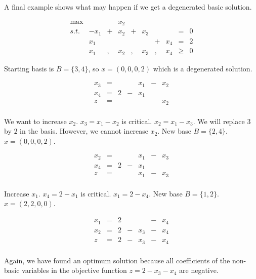 \documentclass[12pt, showidx, twoside]{article}
\begin{document}
{{{A final example shows what may happen if we get a degenerated basic solution.

\begin{equation*}
\begin{array}{rrcrccrcrl}
\max  &     &   &   x_2 &   &     &   &    &     &  \\
 s.t. & -x_1 & + &  x_2 & + & x_3 &   &     &  =  & 0\\
      &  x_1 &   &      &   &     & + & x_4 &  =  & 2\\
      &  x_1 & , &  x_2 & , & x_3 & , & x_4 & \geq & 0
\end{array}
\end{equation*}

Starting basis is  $B = \{3,4\}$, so $x =(0,0,0,2)$ which
is a degenerated solution.

\[
\begin{array}{ccccccc}
x_3 & = &   &   & x_1 & - & x_2 \\
x_4 & = & 2 & - & x_1 &   &     \\ \hline
z   & = &   &   &     &   & x_2 \\
\end{array}
\]

We want to increase $x_2$. $x_3 = x_1 - x_2$ is critical.
$x_2 = x_1 - x_3$.  We will replace $3$ by $2$ in the basis.
However, we cannot increase $x_2$.
New base $B = \{2,4\}$.
$x = (0,0,0,2)$.

\[
\begin{array}{ccccccc}
x_2 & = &   &   & x_1 & - & x_3 \\
x_4 & = & 2 & - & x_1 &   &     \\ \hline
z   & = &   &   & x_1 & - & x_3 \\
\end{array}
\]

Increase $x_1$. $x_4 = 2 - x_1$ is critical.
$x_1 = 2 - x_4$. New base $B=\{1,2\}$.
$x = (2,2,0,0)$.

\[
\begin{array}{ccccccc}
x_1 & = & 2 &   &     & - & x_4 \\ 
x_2 & = & 2 & - & x_3 & - & x_4 \\ \hline
z   & = & 2 & - & x_3 & - & x_4 \\
\end{array}
\]

Again, we have found an optimum solution because all coefficients
of the non-basic variables in the objective function 
$z = 2 - x_3 - x_4$ are negative.

}}}
\end{document}
